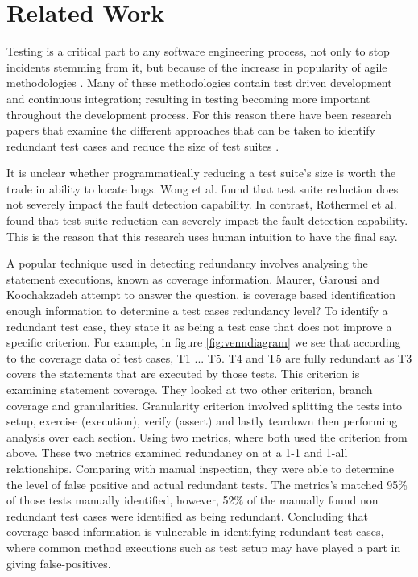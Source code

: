 \chapter{Related Work}\label{C:related}

Testing is a critical part to any software engineering process, not only to stop incidents stemming from it, but because of the increase in popularity of agile methodologies \cite{chaos}. Many of these methodologies contain test driven development and continuous integration; resulting in testing becoming more important throughout the development process. For this reason there have been research papers that examine the different approaches that can be taken to identify redundant test cases and reduce the size of test suites \cite{wong1995effect} \cite{wong1999test} \cite{rothermel1998empirical} \cite{rothermel2002empirical} \cite{koochakzadeh2009test} \cite{zhang2011empirical} \cite{li2008static}.

It is unclear whether programmatically reducing a test suite's size is worth the trade in ability to locate bugs.  Wong et al. \cite{wong1995effect} \cite{wong1999test} found that test suite reduction does not severely impact the fault detection capability. In contrast, Rothermel et al. \cite{rothermel1998empirical} \cite{rothermel2002empirical} found that test-suite reduction can severely impact the fault detection capability. This is the reason that this research uses human intuition to have the final say.

A popular technique used in detecting redundancy involves analysing the statement executions, known as coverage information. Maurer, Garousi and Koochakzadeh \cite{koochakzadeh2009test} attempt to answer the question, is coverage based identification enough information to determine a test cases redundancy level? To identify a redundant test case, they state it as being a test case that does not improve a specific criterion. For example, in figure \ref{fig:venndiagram} we see that according to the coverage data of test cases, T1 ... T5. T4 and T5 are fully redundant as T3 covers the statements that are executed by those tests. This criterion is examining statement coverage. They looked at two other criterion, branch coverage and granularities. Granularity criterion involved splitting the tests into setup, exercise (execution), verify (assert) and lastly teardown then performing analysis over each section. Using two metrics, where both used the criterion from above. These two metrics examined redundancy on at a 1-1 and 1-all relationships. Comparing with manual inspection, they were able to determine the level of false positive and actual redundant tests. The metrics's matched 95\% of those tests manually identified, however, 52\% of the manually found non redundant test cases were identified as being redundant. Concluding that coverage-based information is vulnerable in identifying redundant test cases, where common method executions such as test setup may have played a part in giving false-positives. 

